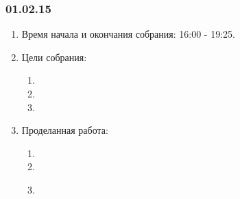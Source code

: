 \subsubsection{01.02.15}
\begin{enumerate}
	
	\item Время начала и окончания собрания: 16:00 - 19:25.
	
	\item Цели собрания: 
	\begin{enumerate}
		
		\item 
		
		\item 
		
        \item 
		
	\end{enumerate}

	\item Проделанная работа:
	\begin{enumerate}
		
		\item 
		
		\item 
		
        \item 
		
        \begin{figure}[H]
	  	  \begin{minipage}[h]{0.2\linewidth}
	  	    \center  
	  	  \end{minipage}
	  	  \begin{minipage}[h]{0.6\linewidth}
	  		\caption{}
	  	  \end{minipage}
	   \end{figure}


\end{enumerate}
\end{enumerate}
